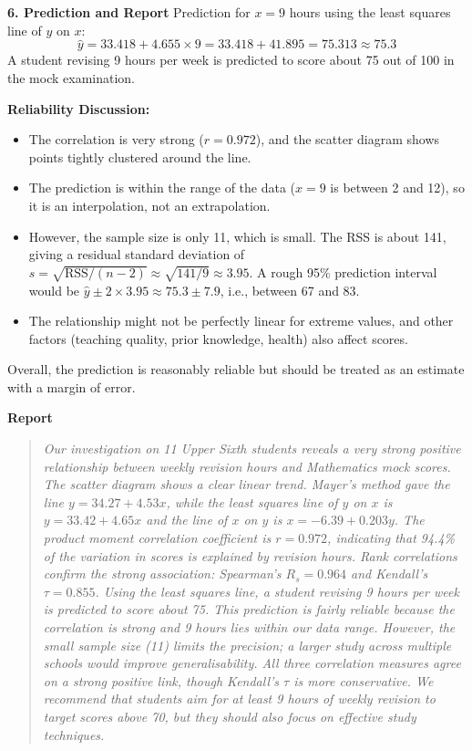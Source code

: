 \documentclass[11pt]{article}
\begin{document}
\begin{exoresolu}
\textbf{6. Prediction and Report}
Prediction for $x = 9$ hours using the least squares line of $y$ on $x$:
\[
\hat{y} = 33.418 + 4.655 \times 9 = 33.418 + 41.895 = 75.313 \approx 75.3
\]
A student revising 9 hours per week is predicted to score about 75 out of 100 in the mock examination.

\textbf{Reliability Discussion:}
\begin{itemize}
    \item The correlation is very strong ($r = 0.972$), and the scatter diagram shows points tightly clustered around the line.
    \item The prediction is within the range of the data ($x=9$ is between 2 and 12), so it is an interpolation, not an extrapolation.
    \item However, the sample size is only 11, which is small. The RSS is about 141, giving a residual standard deviation of $s = \sqrt{\text{RSS}/(n-2)} \approx \sqrt{141/9} \approx 3.95$. A rough 95\% prediction interval would be $\hat{y} \pm 2 \times 3.95 \approx 75.3 \pm 7.9$, i.e., between 67 and 83.
    \item The relationship might not be perfectly linear for extreme values, and other factors (teaching quality, prior knowledge, health) also affect scores.
\end{itemize}
Overall, the prediction is reasonably reliable but should be treated as an estimate with a margin of error.

\textbf{Report}
\begin{quote}
\textit{Our investigation on 11 Upper Sixth students reveals a very strong positive relationship between weekly revision hours and Mathematics mock scores. The scatter diagram shows a clear linear trend. Mayer's method gave the line $y = 34.27 + 4.53x$, while the least squares line of $y$ on $x$ is $y = 33.42 + 4.65x$ and the line of $x$ on $y$ is $x = -6.39 + 0.203y$. The product moment correlation coefficient is $r = 0.972$, indicating that 94.4\% of the variation in scores is explained by revision hours. Rank correlations confirm the strong association: Spearman's $R_s = 0.964$ and Kendall's $\tau = 0.855$. Using the least squares line, a student revising 9 hours per week is predicted to score about 75. This prediction is fairly reliable because the correlation is strong and 9 hours lies within our data range. However, the small sample size (11) limits the precision; a larger study across multiple schools would improve generalisability. All three correlation measures agree on a strong positive link, though Kendall's $\tau$ is more conservative. We recommend that students aim for at least 9 hours of weekly revision to target scores above 70, but they should also focus on effective study techniques.}
\end{quote}
\end{exoresolu}
\end{document}
